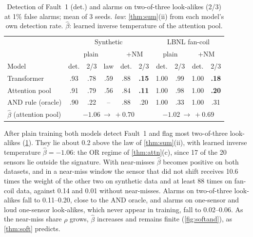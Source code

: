 \documentclass{article}
\theoremstyle{plain}
\theoremstyle{definition}
\theoremstyle{remark}
\begin{document}
\begin{table}[t]
  \caption{Detection of Fault~1 (det.) and alarms on two-of-three look-alikes (2/3) at 1\% false alarms; mean of 3 seeds. \emph{law}: \cref{thm:sum}(ii) from each model's own detection rate. $\hat\beta$: learned inverse temperature of the attention pool.}\label{tab:main}
  \vspace{-1mm}
  \centering\footnotesize\setlength{\tabcolsep}{2.3pt}
  \begin{tabular}{@{}lccc|cc|cc|cc@{}}
    \toprule
    & \multicolumn{5}{c|}{Synthetic} & \multicolumn{4}{c}{LBNL fan-coil}\\
    & \multicolumn{3}{c|}{plain} & \multicolumn{2}{c|}{+NM} & \multicolumn{2}{c|}{plain} & \multicolumn{2}{c}{+NM}\\
    Model & det. & 2/3 & law & det. & 2/3 & det. & 2/3 & det. & 2/3\\
    \midrule
    Transformer & .93 & .78 & .59 & .88 & \textbf{.15} & 1.00 & .99 & 1.00 & \textbf{.18}\\
    Attention pool & .91 & .79 & .56 & .84 & \textbf{.11} & 1.00 & .98 & 1.00 & \textbf{.20}\\
    AND rule (oracle) & .90 & .22 & -- & .88 & .20 & 1.00 & .33 & 1.00 & .31\\
    \midrule
    $\hat\beta$ (attention pool) & \multicolumn{5}{c|}{$-1.06\ \to\ +0.70$} & \multicolumn{4}{c}{$-1.02\ \to\ +0.69$}\\
    \bottomrule
  \end{tabular}
  \vspace{-3mm}
\end{table}

After plain training both models detect Fault~1 and flag most two-of-three look-alikes (\cref{tab:main}). They lie about 0.2 above the law of \cref{thm:sum}(ii), with learned inverse temperature $\hat\beta=-1.06$: the OR regime of \cref{thm:attn}(c), since 17 of the 20 sensors lie outside the signature. With near-misses $\hat\beta$ becomes positive on both datasets, and in a near-miss window the sensor that did not shift receives 10.6 times the weight of the other two on synthetic data and at least 88 times on fan-coil data, against 0.14 and 0.01 without near-misses. Alarms on two-of-three look-alikes fall to 0.11--0.20, close to the AND oracle, and alarms on one-sensor and loud one-sensor look-alikes, which never appear in training, fall to 0.02--0.06. As the near-miss share $\rho$ grows, $\hat\beta$ increases and remains finite (\cref{fig:softand}), as \cref{thm:soft} predicts.
\end{document}
